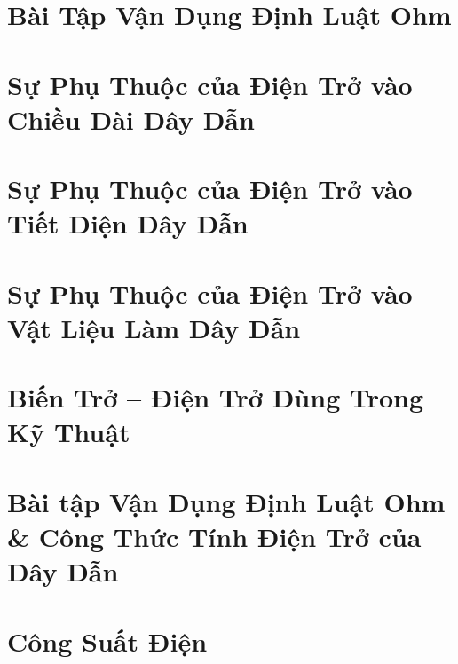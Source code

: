 \documentclass{article}
\begin{document}

\section{Bài Tập Vận Dụng Định Luật Ohm}


\section{Sự Phụ Thuộc của Điện Trở vào Chiều Dài Dây Dẫn}


\section{Sự Phụ Thuộc của Điện Trở vào Tiết Diện Dây Dẫn}


\section{Sự Phụ Thuộc của Điện Trở vào Vật Liệu Làm Dây Dẫn}


\section{Biến Trở -- Điện Trở Dùng Trong Kỹ Thuật}


\section{Bài tập Vận Dụng Định Luật Ohm \& Công Thức Tính Điện Trở của Dây Dẫn}


\section{Công Suất Điện}
\end{document}
